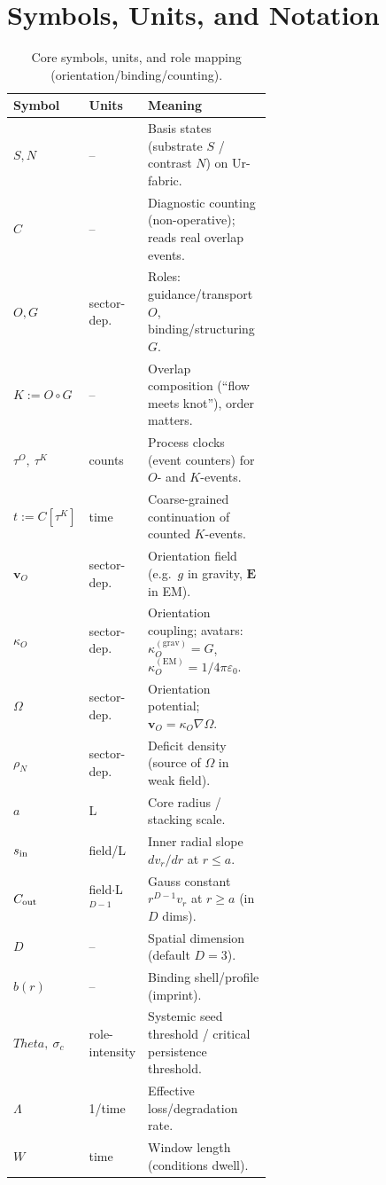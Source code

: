 \documentclass[12pt,a4paper,oneside]{scrreprt}
\def\Theta{Theta}%
\begin{document}
\appendix

\chapter{Symbols, Units, and Notation}\label{app:symbols}
\begin{table}[htbp]\centering
\caption{Core symbols, units, and role mapping (orientation/binding/counting).}
\begin{tabular}{llp{0.58\linewidth}}\toprule
Symbol & Units & Meaning \\ \midrule
$S,N$ & – & Basis states (substrate $S$ / contrast $N$) on Ur-fabric.\\
$C$ & – & Diagnostic counting (non-operative); reads real overlap events.\\
$O,G$ & sector-dep. & Roles: guidance/transport $O$, binding/structuring $G$.\\
$K:=O\!\circ G$ & – & Overlap composition (“flow meets knot”), order matters.\\
$\tau^O,\ \tau^K$ & counts & Process clocks (event counters) for $O$- and $K$-events.\\
$t:=C[\tau^K]$ & time & Coarse-grained continuation of counted $K$-events.\\
$\mathbf v_O$ & sector-dep. & Orientation field (e.g.\ $g$ in gravity, $\mathbf E$ in EM).\\
$\kappa_O$ & sector-dep. & Orientation coupling; avatars: $\kappa_O^{(\mathrm{grav})}=G$, $\kappa_O^{(\mathrm{EM})}=1/4\pi\varepsilon_0$.\\
$\Omega$ & sector-dep. & Orientation potential; $\mathbf v_O=\kappa_O\nabla\Omega$.\\
$\rho_N$ & sector-dep. & Deficit density (source of $\Omega$ in weak field).\\
$a$ & L & Core radius / stacking scale.\\
$s_{\rm in}$ & field/L & Inner radial slope $dv_r/dr$ at $r\le a$.\\
$C_{\rm out}$ & field$\cdot$L$^{D-1}$ & Gauss constant $r^{D-1}v_r$ at $r\ge a$ (in $D$ dims).\\
$D$ & – & Spatial dimension (default $D=3$).\\
$b(r)$ & – & Binding shell/profile (imprint).\\
$\Theta,\ \sigma_c$ & role-intensity & Systemic seed threshold / critical persistence threshold.\\
$\Lambda$ & 1/time & Effective loss/degradation rate.\\
$W$ & time & Window length (conditions dwell).\\

\end{tabular}
\end{table}
\end{document}

